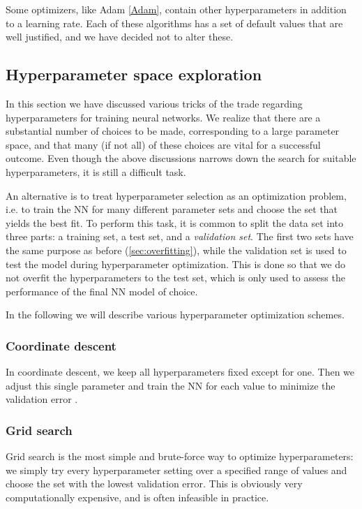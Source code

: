 \documentclass[twoside,english]{uiofysmaster}
\begin{document}
Some optimizers, like Adam \eqref{Adam}, contain other hyperparameters in addition to a learning rate.  
Each of these algorithms has a set of default values that are well justified, and we have decided not to alter these. 


\subsection{Hyperparameter space exploration} \label{sec:optimizingHyperparameters}
In this section we have discussed various tricks of the trade regarding hyperparameters for training neural networks. 
We realize that there are a substantial number of choices to be made, corresponding to a large parameter space, and 
that many (if not all) of these choices are vital for a successful outcome. Even though the above discussions narrows down the search 
for suitable hyperparameters, it is still a difficult task. 

An alternative is to treat hyperparameter selection as an optimization problem, i.e. to train the NN for many different 
parameter sets and choose the set that yields the best fit. To perform this task, it is common to split the data set 
into three parts: a training set, a test set, and a \textit{validation set}. The first two sets have the same 
purpose as before (\autoref{sec:overfitting}), while the validation set is used to test the model during hyperparameter 
optimization. This is done so that we do not overfit the hyperparameters to the test set, which is only used to assess 
the performance of the final NN model of choice.

In the following we will describe various hyperparameter optimization schemes. 

\subsubsection{Coordinate descent}
In coordinate descent, we keep all hyperparameters fixed except for one. Then we adjust this single parameter and train the NN
for each value to minimize the validation error  .

\subsubsection{Grid search}
Grid search is the most simple and brute-force way to optimize hyperparameters: we simply try every hyperparameter setting 
over a specified range of values and choose the set with the lowest validation error. This is obviously very computationally 
expensive, and is often infeasible in practice. 
\end{document}
